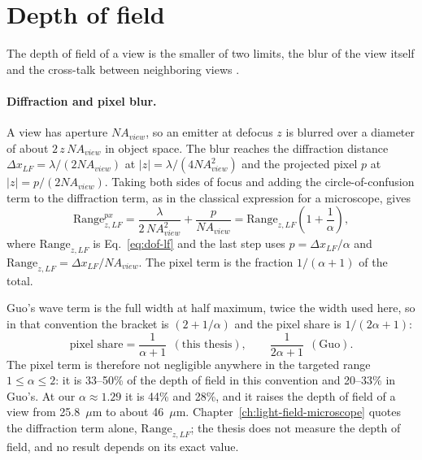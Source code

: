 \section{Depth of field}
\label{sec:app-dof}

The depth of field of a view is the smaller of two limits, the blur of the view itself and the cross-talk between neighboring views \cite{guo2019fourierLightField}.

\paragraph{Diffraction and pixel blur.} A view has aperture $NA_{view}$, so an emitter at defocus $z$ is blurred over a diameter of about $2\,z\,NA_{view}$ in object space. The blur reaches the diffraction distance $\Delta x_{LF}=\lambda/(2NA_{view})$ at $|z|=\lambda/(4NA_{view}^2)$ and the projected pixel $p$ at $|z|=p/(2NA_{view})$. Taking both sides of focus and adding the circle-of-confusion term to the diffraction term, as in the classical expression for a microscope, gives
\begin{equation}
    \mathrm{Range}_{z,LF}^{px}
    = \frac{\lambda}{2\,NA_{view}^2} + \frac{p}{NA_{view}}
    = \mathrm{Range}_{z,LF}\left(1+\frac{1}{\alpha}\right),
    \label{eq:app-dof-pixel}
\end{equation}
where $\mathrm{Range}_{z,LF}$ is Eq.~\eqref{eq:dof-lf} and the last step uses $p=\Delta x_{LF}/\alpha$ and $\mathrm{Range}_{z,LF}=\Delta x_{LF}/NA_{view}$. The pixel term is the fraction $1/(\alpha+1)$ of the total.

Guo's wave term is the full width at half maximum, twice the width used here, so in that convention the bracket is $(2+1/\alpha)$ and the pixel share is $1/(2\alpha+1)$:
\begin{equation}
    \text{pixel share} = \frac{1}{\alpha+1}\ \ (\text{this thesis}), \qquad
    \frac{1}{2\alpha+1}\ \ (\text{Guo}).
    \label{eq:app-dof-share}
\end{equation}
The pixel term is therefore not negligible anywhere in the targeted range $1\le\alpha\le2$: it is 33--50\% of the depth of field in this convention and 20--33\% in Guo's. At our $\alpha\approx1.29$ it is 44\% and 28\%, and it raises the depth of field of a view from 25.8~$\mu$m to about 46~$\mu$m. Chapter~\ref{ch:light-field-microscope} quotes the diffraction term alone, $\mathrm{Range}_{z,LF}$; the thesis does not measure the depth of field, and no result depends on its exact value.

